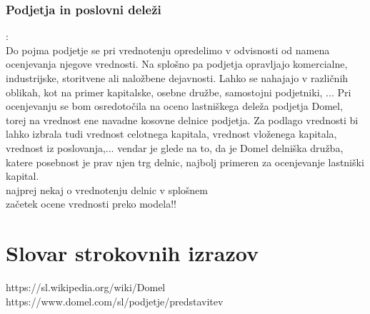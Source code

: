 \documentclass[12pt,a4paper]{amsart}
\theoremstyle{definition} %
\theoremstyle{plain} %
\newcommand{\geslo}[2]{\noindent\textbf{#1}\hspace*{3mm}\hangindent=\parindent\hangafter=1 #2}
\begin{document}
\subsubsection*{Podjetja in poslovni deleži}:\\
Do pojma podjetje se pri vrednotenju opredelimo v odvisnosti od namena ocenjevanja njegove vrednosti. Na splošno pa podjetja opravljajo komercialne, industrijske, storitvene ali naložbene dejavnosti. Lahko se nahajajo v različnih oblikah, kot na primer kapitalske, osebne družbe, samostojni podjetniki, ... Pri ocenjevanju se bom osredotočila na oceno lastniškega deleža podjetja Domel, torej na vrednost ene navadne kosovne delnice podjetja. Za podlago vrednosti bi lahko izbrala tudi vrednost celotnega kapitala, vrednost vloženega kapitala, vrednost iz poslovanja,... vendar je glede na to, da je Domel delniška družba, katere posebnost je prav njen trg delnic, najbolj primeren za ocenjevanje lastniški kapital.\\
 
najprej nekaj o vrednotenju delnic v splošnem\\
začetek ocene vrednosti preko modela!!


  







\section*{Slovar strokovnih izrazov}

%
%


\begin{thebibliography}{99}
https://sl.wikipedia.org/wiki/Domel
https://www.domel.com/sl/podjetje/predstavitev



\end{thebibliography}
\end{document}
